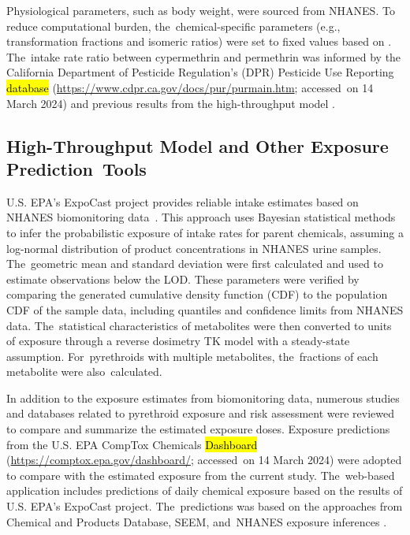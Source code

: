 \documentclass[toxics,article,accept,pdftex,moreauthors]{Definitions/mdpi}
\begin{document}
Physiological parameters, such as body weight, were sourced from NHANES.
To reduce computational burden, the~chemical-specific parameters (e.g.,
transformation fractions and isomeric ratios) were set to fixed values
based on \citet{quindroit2019estimating}. The~intake rate ratio between
cypermethrin and permethrin was informed by the California
Department of Pesticide Regulation's (DPR) Pesticide Use Reporting
\hl{database} %
 (\url{https://www.cdpr.ca.gov/docs/pur/purmain.htm}; accessed~on 14 March 2024) and
previous results from the high-throughput model
\citep{stanfield2022bayesian}.

\subsection{High-Throughput Model and Other Exposure Prediction~Tools}\label{high-throughput-model-and-other-exposure-prediction-tools}

U.S. EPA's ExpoCast project provides reliable intake estimates based
on NHANES biomonitoring data~\citep{wambaugh2013high}. This approach
uses Bayesian statistical methods to infer the probabilistic exposure of
intake rates for parent chemicals, assuming a log-normal distribution of
product concentrations in NHANES urine samples. The~geometric mean and
standard deviation were first calculated and used to estimate
observations below the LOD. These parameters were verified by comparing
the generated cumulative density function (CDF) to the population CDF of
the sample data, including quantiles and confidence limits from NHANES
data. The~statistical characteristics of metabolites were then converted
to units of exposure through a reverse dosimetry TK model with a
steady-state assumption. For~pyrethroids with multiple metabolites, the~fractions of each metabolite were also~calculated.

In addition to the exposure estimates from biomonitoring data, numerous
studies and databases related to pyrethroid exposure and risk assessment
were reviewed to compare and summarize the estimated exposure doses.
Exposure predictions from the U.S. EPA CompTox Chemicals \hl{Dashboard} %
(\url{https://comptox.epa.gov/dashboard/}; accessed~on 14 March 2024) were adopted to compare with
the estimated exposure from the current study. The~web-based application
includes predictions of daily chemical exposure based on the results of
U.S. EPA's ExpoCast project. The~predictions was based on the approaches 
from Chemical and Products Database, SEEM, and~NHANES exposure inferences
\citep{dionisio2018chemical, wambaugh2022exposure}.
\end{document}
